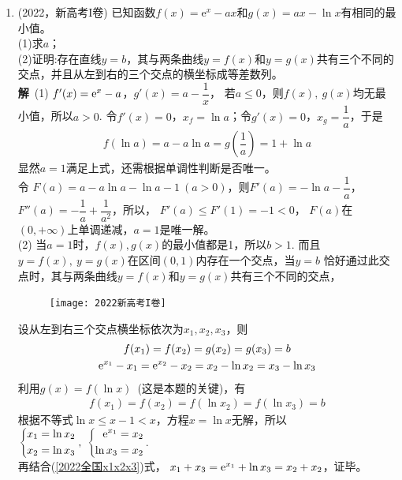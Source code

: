\begin{enumerate}[label={【\textbf{例\thechapter.\arabic*}】},
 leftmargin=\inteval{\myenumleftmargin}pt,
 itemsep=\inteval{\myenumitempsep}pt,
 itemindent=\inteval{\myenumitemindent}pt]
\item \label{2022新高考I卷导数x1x2x3}(2022，新高考I卷)
已知函数$f(x)=\mathrm{e}^{x}-ax$和$g(x)=ax-\ln x$有相同的最小值。\\
(1)求$a$；\\
(2)证明:存在直线$y=b$，其与两条曲线$y=f(x)$和$y=g(x)$共有三个不同的交点，并且从左到右的三个交点的横坐标成等差数列。\\
\textbf{解}\ (1) $ f'(x)=\mathrm{e}^x-a $，$ g'(x)=a-\dfrac{1}{x} $，
若$ a\leq 0 $，则$ f(x),\ g(x) $均无最小值，所以$ a>0 $.
令$ f'(x)=0 $，$ x_f=\ln a $；令$ g'(x)=0 $，$ x_g=\dfrac{1}{a} $，于是
\begin{gather*}
    f(\ln a)=a-a\ln a=g\left(\dfrac{1}{a}\right)=1+\ln a
\end{gather*}
显然$ a=1 $满足上式，还需根据单调性判断是否唯一。\\ 令
$ F(a)=a-a\ln a-\ln a-1\ (a>0) $，则$ F'(a)=-\ln a-\dfrac{1}{a} $，
$ F''(a)=-\dfrac{1}{a}+\dfrac{1}{a^2} $，所以，
$ F'(a)\leq F'(1)=-1<0 $，
$ F(a) $在$ (0,+\infty) $上单调递减，$ a=1 $是唯一解。\\
(2) 当$ a=1 $时，$ f(x),g(x) $的最小值都是1，所以$ b>1 $.
而且$ y=f(x),\ y=g(x) $在区间$ (0,1) $内存在一个交点，当$ y=b $
恰好通过此交点时，其与两条曲线$y=f(x)$和$y=g(x)$共有三个不同的交点，
\begin{figure}[!ht]
    \centering
    \texttt{[image: 2022新高考I卷]}
\end{figure}
\noindent 设从左到右三个交点横坐标依次为$ x_1,x_2,x_3 $，则
\begin{gather}
    f(x_1)=f(x_2)=g(x_2)=g(x_3)=b \nonumber \\
    \mathrm{e}^{x_1}-x_1=\mathrm{e}^{x_2}-x_2=x_2-\ln x_2=x_3-\ln x_3 
    \label{2022全国x1x2x3}
\end{gather}
利用$ g(x)=f(\ln x) $\ (这是本题的关键)，有
\begin{gather*}
    f(x_1)=f(x_2)=f(\ln x_2)=f(\ln x_3)=b
\end{gather*}
根据不等式$ \ln x\leq x-1<x $，方程$ x=\ln x $无解，所以
$ \left\{\begin{aligned}
    x_1=\ln x_2 \\
    x_2=\ln x_3
\end{aligned}\right.,\ 
\left\{\begin{aligned}
    \e^{x_1}=x_2 \\
    \ln x_3=x_2
\end{aligned}\right. $. \\再结合(\ref{2022全国x1x2x3})式，
$ x_1+x_3=\mathrm{e}^{x_1}+\ln x_3=x_2+x_2 $，证毕。


\end{enumerate}
